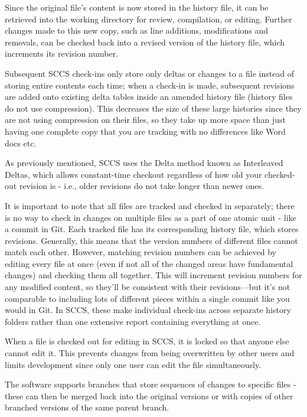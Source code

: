 Since the original file's content is now stored in the history file, it can be retrieved into the working directory for review, compilation, or editing. Further changes made to this new copy, such as line additions, modifications and removals, can be checked back into a revised version of the history file, which increments its revision number.

Subsequent SCCS check-ins only store only deltas or changes to a file instead of storing entire contents each time; when a check-in is made, subsequent revisions are added onto existing delta tables inside an amended history file (history files do not use compression). This decreases the size of these large histories since they are not using compression on their files, so they take up more space than just having one complete copy that you are tracking with no differences like Word docs etc.

As previously mentioned, SCCS uses the Delta method known as Interleaved Deltas, which allows constant-time checkout regardless of how old your checked-out revision is - i.e., older revisions do not take longer than newer ones.

It is important to note that all files are tracked and checked in separately; there is no way to check in changes on multiple files as a part of one atomic unit - like a commit in Git. Each tracked file has its corresponding history file, which stores revisions. Generally, this means that the version numbers of different files cannot match each other. However, matching revision numbers can be achieved by editing every file at once (even if not all of the changed areas have fundamental changes) and checking them all together. This will increment revision numbers for any modified content, so they'll be consistent with their revisions—but it's not comparable to including lots of different pieces within a single commit like you would in Git. In SCCS, these make individual check-ins across separate history folders rather than one extensive report containing everything at once.

When a file is checked out for editing in SCCS, it is locked so that anyone else cannot edit it. This prevents changes from being overwritten by other users and limits development since only one user can edit the file simultaneously.

The software supports branches that store sequences of changes to specific files - these can then be merged back into the original versions or with copies of other branched versions of the same parent branch.

